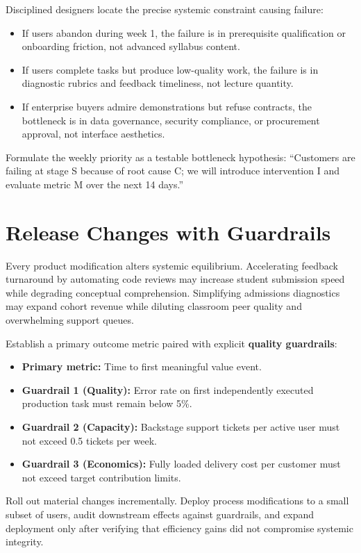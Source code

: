 Disciplined designers locate the precise systemic constraint causing failure:
\begin{itemize}[leftmargin=*]
\item If users abandon during week 1, the failure is in prerequisite qualification or onboarding friction, not advanced syllabus content.
\item If users complete tasks but produce low-quality work, the failure is in diagnostic rubrics and feedback timeliness, not lecture quantity.
\item If enterprise buyers admire demonstrations but refuse contracts, the bottleneck is in data governance, security compliance, or procurement approval, not interface aesthetics.
\end{itemize}

Formulate the weekly priority as a testable bottleneck hypothesis: ``Customers are failing at stage S because of root cause C; we will introduce intervention I and evaluate metric M over the next 14 days.''

\section{Release Changes with Guardrails}

Every product modification alters systemic equilibrium. Accelerating feedback turnaround by automating code reviews may increase student submission speed while degrading conceptual comprehension. Simplifying admissions diagnostics may expand cohort revenue while diluting classroom peer quality and overwhelming support queues.

Establish a primary outcome metric paired with explicit \textbf{quality guardrails}:
\begin{itemize}[leftmargin=*]
\item \textbf{Primary metric:} Time to first meaningful value event.
\item \textbf{Guardrail 1 (Quality):} Error rate on first independently executed production task must remain below 5\%.
\item \textbf{Guardrail 2 (Capacity):} Backstage support tickets per active user must not exceed 0.5 tickets per week.
\item \textbf{Guardrail 3 (Economics):} Fully loaded delivery cost per customer must not exceed target contribution limits.
\end{itemize}

Roll out material changes incrementally. Deploy process modifications to a small subset of users, audit downstream effects against guardrails, and expand deployment only after verifying that efficiency gains did not compromise systemic integrity.

